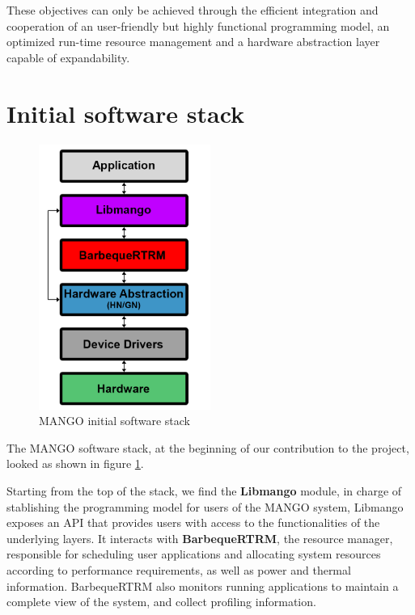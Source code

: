 These objectives can only be achieved through the efficient integration and cooperation of an user-friendly but highly functional programming model, an optimized run-time resource management and a hardware abstraction layer capable of expandability.

\section{Initial software stack}

\begin{figure}[ht]
    \centering
    \includegraphics[width=0.5\textwidth]{img/mango-initial-stack.png}
    \captionsetup{justification=centering}
    \caption{MANGO initial software stack}
    \label{fig:mango_initial_stack}
\end{figure}
 
The MANGO software stack, at the beginning of our contribution to the project, looked as shown in figure \ref{fig:mango_initial_stack}.

Starting from the top of the stack, we find the \textbf{Libmango} module, in charge of stablishing the programming model for users of the MANGO system, Libmango exposes an API that provides users with access to the functionalities of the underlying layers. 
It interacts with \textbf{BarbequeRTRM}, the resource manager, responsible for scheduling user applications and allocating system resources according to performance requirements, as well as power and thermal information. BarbequeRTRM also monitors running applications to maintain a complete view of the system, and collect profiling information.

